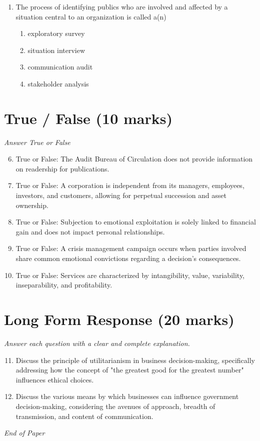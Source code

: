 \documentclass[12pt]{article}
\begin{document}
\begin{enumerate}[label=\arabic*.]
\begin{enumerate}[label=(\alph*)]
    \item Generally cheaper to gather than primary data and takes less time to find.
\end{enumerate}
\item The process of identifying publics who are involved and affected by a situation central to an organization is called a(n)
\begin{enumerate}[label=(\alph*)]
    \item exploratory survey
    \item situation interview
    \item communication audit
    \item stakeholder analysis
\end{enumerate}
\end{enumerate}

\section*{True / False (10 marks)}
\textit{Answer True or False}
\begin{enumerate}[label=\arabic*.]
\setcounter{enumi}{5}
\item True or False: The Audit Bureau of Circulation does not provide information on readership for publications.
\item True or False: A corporation is independent from its managers, employees, investors, and customers, allowing for perpetual succession and asset ownership.
\item True or False: Subjection to emotional exploitation is solely linked to financial gain and does not impact personal relationships.
\item True or False: A crisis management campaign occurs when parties involved share common emotional convictions regarding a decision's consequences.
\item True or False: Services are characterized by intangibility, value, variability, inseparability, and profitability.
\end{enumerate}

\section*{Long Form Response (20 marks)}
\textit{Answer each question with a clear and complete explanation.}
\begin{enumerate}[label=\arabic*.]
\setcounter{enumi}{10}
\item Discuss the principle of utilitarianism in business decision-making, specifically addressing how the concept of "the greatest good for the greatest number" influences ethical choices.
\item Discuss the various means by which businesses can influence government decision-making, considering the avenues of approach, breadth of transmission, and content of communication.
\end{enumerate}

\vfill
\noindent\textit{End of Paper}
\end{document}
